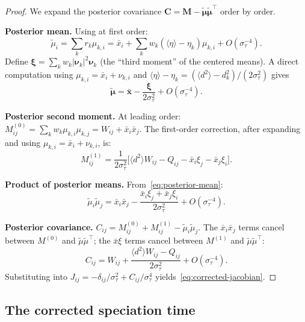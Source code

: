 \documentclass[11pt]{article}
\begin{document}
\begin{proof}
We expand the posterior covariance $\bm{C} = \bm{M} - \tilde{\bm{\mu}}\tilde{\bm{\mu}}^\top$ order by order.

\medskip\noindent\textbf{Posterior mean.}
Using  at first order:
\[
  \tilde{\mu}_i = \sum_k r_k \mu_{k,i}
  = \bar{x}_i + \sum_k w_k(\langle\eta\rangle - \eta_k)\mu_{k,i} + O(\sigma_\tau^{-4}).
\]
Define $\bm{\xi} = \sum_k w_k|\bm{\nu}_k|^2\bm{\nu}_k$ (the ``third moment'' of the centered means).
A direct computation using $\mu_{k,i} = \bar{x}_i + \nu_{k,i}$ and $\langle\eta\rangle - \eta_k = (\langle d^2\rangle - d_k^2)/(2\sigma_\tau^2)$ gives
\begin{equation}\label{eq:posterior-mean}
  \tilde{\bm{\mu}} = \bar{\bm{x}} - \frac{\bm{\xi}}{2\sigma_\tau^2} + O(\sigma_\tau^{-4}).
\end{equation}

\medskip\noindent\textbf{Posterior second moment.}
At leading order: $M_{ij}^{(0)} = \sum_k w_k\mu_{k,i}\mu_{k,j} = W_{ij} + \bar{x}_i\bar{x}_j$.
The first-order correction, after expanding and using $\mu_{k,i} = \bar{x}_i + \nu_{k,i}$, is:
\begin{equation}\label{eq:M-correction}
  M_{ij}^{(1)} = \frac{1}{2\sigma_\tau^2}\bigl[\langle d^2\rangle W_{ij} - Q_{ij} - \bar{x}_i\xi_j - \bar{x}_j\xi_i\bigr].
\end{equation}

\medskip\noindent\textbf{Product of posterior means.}
From~\eqref{eq:posterior-mean}:
\[
  \tilde{\mu}_i\tilde{\mu}_j = \bar{x}_i\bar{x}_j - \frac{\bar{x}_i\xi_j + \bar{x}_j\xi_i}{2\sigma_\tau^2} + O(\sigma_\tau^{-4}).
\]

\medskip\noindent\textbf{Posterior covariance.}
$C_{ij} = M_{ij}^{(0)} + M_{ij}^{(1)} - \tilde{\mu}_i\tilde{\mu}_j$. The $\bar{x}_i\bar{x}_j$ terms cancel between $M^{(0)}$ and $\tilde{\mu}\tilde{\mu}^\top$; the $\bar{x}\xi$ terms cancel between $M^{(1)}$ and $\tilde{\mu}\tilde{\mu}^\top$:
\begin{equation}\label{eq:C-expansion}
  C_{ij} = W_{ij} + \frac{\langle d^2\rangle W_{ij} - Q_{ij}}{2\sigma_\tau^2} + O(\sigma_\tau^{-4}).
\end{equation}
Substituting into $J_{ij} = -\delta_{ij}/\sigma_\tau^2 + C_{ij}/\sigma_\tau^4$ yields~\eqref{eq:corrected-jacobian}.
\end{proof}

\subsection{The corrected speciation time}\label{sec:corr:speciation}
\end{document}
